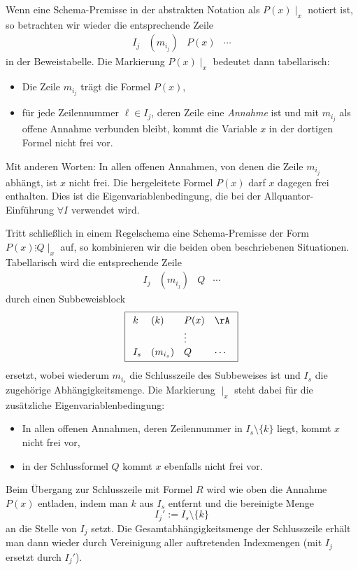 \documentclass[main.tex]{subfiles}
\begin{document}
Wenn eine Schema-Premisse in der abstrakten Notation als
\(P(x)\mid_x\) notiert ist, so betrachten wir wieder die
entsprechende Zeile
\[
  \begin{array}{llll}
    I_j & (m_{i_j}) & P(x) & \cdots
  \end{array}
\]
in der Beweistabelle. Die Markierung \(P(x)\mid_x\) bedeutet dann
tabellarisch:
\begin{itemize}
  \item Die Zeile \(m_{i_j}\) trägt die Formel \(P(x)\),
  \item für jede Zeilennummer \(\ell \in I_j\), deren Zeile eine
        \emph{Annahme} ist und mit \(m_{i_j}\) als offene Annahme
        verbunden bleibt, kommt die Variable \(x\) in der dortigen
        Formel nicht frei vor.
\end{itemize}
Mit anderen Worten: In allen offenen Annahmen, von denen die Zeile
\(m_{i_j}\) abhängt, ist \(x\) nicht frei. Die hergeleitete
Formel \(P(x)\) darf \(x\) dagegen frei enthalten. Dies ist die Eigenvariablenbedingung, die
bei der Allquantor-Einführung \(\forall I\) verwendet wird.

\medskip

Tritt schließlich in einem Regelschema eine Schema-Premisse der Form
\(P(x)\vdots Q\mid_x\) auf, so kombinieren wir die beiden oben
beschriebenen Situationen. Tabellarisch wird die entsprechende
Zeile
\[
  \begin{array}{llll}
    I_j & (m_{i_j}) & Q & \cdots
  \end{array}
\]
durch einen Subbeweisblock
\[
\boxed{%
  \begin{array}{llll}
    k   & (k)       & P(x) & \rA   \\[0.2ex]
        &           &\vdots&       \\[0.2ex]
    I_s & (m_{i_s}) & Q    & \cdots
  \end{array}
}
\]
ersetzt, wobei wiederum \(m_{i_s}\) die Schlusszeile des Subbeweises
ist und \(I_s\) die zugehörige Abhängigkeitsmenge. Die Markierung
\(\mid_x\) steht dabei für die zusätzliche Eigenvariablenbedingung:
\begin{itemize}
  \item In allen offenen Annahmen, deren Zeilennummer in
        \(I_s \setminus \{k\}\) liegt, kommt \(x\) nicht frei vor,
  \item in der Schlussformel \(Q\) kommt \(x\) ebenfalls nicht frei vor.
\end{itemize}
Beim Übergang zur Schlusszeile mit Formel \(R\) wird wie oben die
Annahme \(P(x)\) entladen, indem man \(k\) aus \(I_s\) entfernt und
die bereinigte Menge
\[
  I_j' := I_s \setminus \{k\}
\]
an die Stelle von \(I_j\) setzt. Die Gesamtabhängigkeitsmenge der
Schlusszeile erhält man dann wieder durch Vereinigung aller
auftretenden Indexmengen (mit \(I_j\) ersetzt durch \(I_j'\)).
\end{document}
